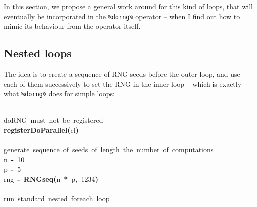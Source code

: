 \documentclass[a4paper,12pt]{article}\usepackage{graphicx, color}
\makeatletter
\newcommand{\hlnumber}[1]{\textcolor[rgb]{0,0,0}{#1}}%
\newcommand{\hlfunctioncall}[1]{\textcolor[rgb]{0.501960784313725,0,0.329411764705882}{\textbf{#1}}}%
\newcommand{\hlkeyword}[1]{\textcolor[rgb]{0,0,0}{\textbf{#1}}}%
\newcommand{\hlcomment}[1]{\textcolor[rgb]{0.180392156862745,0.6,0.341176470588235}{#1}}%
\newcommand{\hlassignement}[1]{\textcolor[rgb]{0,0,0}{\textbf{#1}}}%
\newcommand{\hlsymbol}[1]{\textcolor[rgb]{0,0,0}{#1}}%
\newcommand{\hlstd}[1]{\textcolor[rgb]{0,0,0}{#1}}%
\newenvironment{kframe}{%
 \def\FrameCommand##1{\hskip\@totalleftmargin \hskip-\fboxsep
 \colorbox{shadecolor}{##1}\hskip-\fboxsep
     \hskip-\linewidth \hskip-\@totalleftmargin \hskip\columnwidth}%
 \MakeFramed {\advance\hsize-\width
   \@totalleftmargin\z@ \linewidth\hsize
   \@setminipage}}%
 {\par\unskip\endMakeFramed}
\newenvironment{knitrout}{}{} %
\renewenvironment{knitrout}{\begin{footnotesize}}{\end{footnotesize}}
\let\code=\texttt
\makeatother
\begin{document}
In this section, we propose a general work around for this kind of loops, that will 
eventually be incorporated in the \code{\%dorng\%} operator -- when I find out how to 
mimic its behaviour from the operator itself.

\subsection{Nested loops}

The idea is to create a sequence of RNG seeds before the outer loop, and use each 
of them successively to set the RNG in the inner loop -- which is exactly what \code{\%dorng\%} does 
for simple loops:

\begin{knitrout}
\color{fgcolor}\begin{kframe}
\begin{flushleft}
\ttfamily\noindent
\hspace*{\fill}\\
\hlstd{}\hlcomment{\usebox{\hlnormalsizeboxhash}{\ }doRNG{\ }must{\ }not{\ }be{\ }registered}\hspace*{\fill}\\
\hlstd{}\hlfunctioncall{registerDoParallel}\hlkeyword{(}\hlsymbol{cl}\hlkeyword{)}\hspace*{\fill}\\
\hlstd{}\hspace*{\fill}\\
\hlstd{}\hlcomment{\usebox{\hlnormalsizeboxhash}{\ }generate{\ }sequence{\ }of{\ }seeds{\ }of{\ }length{\ }the{\ }number{\ }of{\ }computations}\hspace*{\fill}\\
\hlstd{}\hlsymbol{n}{\ }\hlassignement{\usebox{\hlnormalsizeboxlessthan}-}{\ }\hlnumber{10}\hspace*{\fill}\\
\hlstd{}\hlsymbol{p}{\ }\hlassignement{\usebox{\hlnormalsizeboxlessthan}-}{\ }\hlnumber{5}\hspace*{\fill}\\
\hlstd{}\hlsymbol{rng}{\ }\hlassignement{\usebox{\hlnormalsizeboxlessthan}-}{\ }\hlfunctioncall{RNGseq}\hlkeyword{(}\hlsymbol{n}{\ }\hlkeyword{*}{\ }\hlsymbol{p}\hlkeyword{,}{\ }\hlnumber{1234}\hlkeyword{)}\hspace*{\fill}\\
\hlstd{}\hspace*{\fill}\\
\hlstd{}\hlcomment{\usebox{\hlnormalsizeboxhash}{\ }run{\ }standard{\ }nested{\ }foreach{\ }loop}\hspace*{\fill}\\

\end{flushleft}
\end{kframe}
\end{knitrout}
\end{document}
